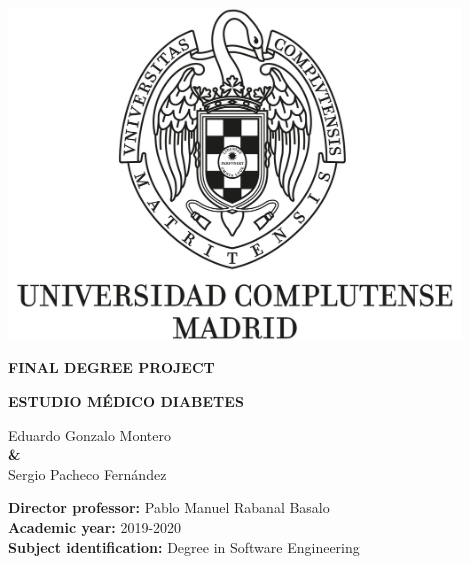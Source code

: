 \documentclass{report}
\begin{document}
\begin{titlepage}
        \clearpage
        
        \pagestyle{empty}
        \centering
        {\includegraphics[width=0.9\textwidth]{images/logo_UCM}}
    
        \vspace{1.5cm}
        
        {\huge\textbf{FINAL DEGREE PROJECT \\ }  }

        \vspace{0.5cm}
        
        {\huge\textbf{ESTUDIO MÉDICO DIABETES}  }
        
        \vspace{2.3cm}
    
        {\Large Eduardo Gonzalo Montero \\}
        \vspace{0.5cm}
        {\textbf \& \\}
        \vspace{0.5cm}
        {\Large Sergio Pacheco Fernández \\}
        
        \vspace{2.3cm}
        
        \raggedright
        {\Large \textbf{Director professor:} Pablo Manuel Rabanal Basalo \\}
        \vspace{0.1cm}
        {\Large\textbf {Academic year:} 2019-2020 \\}
        \vspace{0.1cm}
        {\Large\textbf {Subject identification: }Degree in Software Engineering \\}
    
        \clearpage
     \end{titlepage}
     
    
    \tableofcontents
    
    
    
    
    
    
   
    

    
\end{document}
